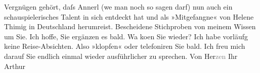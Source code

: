 \begin{ledgroupsized}[t]{13cm}
               Vergnügen gehört, daſs Annerl (we{\geminationn} man noch so sagen darf) nun auch ein
               schauspielerisches Talent in sich entdeckt hat und als »Mitgefangne« von Helene Thimig in Deutschland herumreist. Bescheidene Stichproben von meinem Wissen um Sie.
               Ich hoffe, Sie ergänzen es bald. Wa{\geminationn} ko{\geminationm}en Sie wieder? Ich habe vorläufg keine Reise-Absichten.
               Also »klopfen« oder telefoniren Sie bald. Ich freu mich darauf Sie endlich einmal
               wieder ausführlicher zu sprechen. Von Her\textcolor{gray}{zen} Ihr \pend
           \pstart \spacefill\mbox{Arthur}\pend{}
         
         \endnumbering{}\end{ledgroupsized}\begin{anhang}\end{anhang}\newcommand{\dateiname}{L03022}\newcommand{\titel}{Arthur Schnitzler an Felix Salten, 10. 2. 1927}\newcommand{\editorInnen}{Martin Anton Müller und Laura Untner}
      